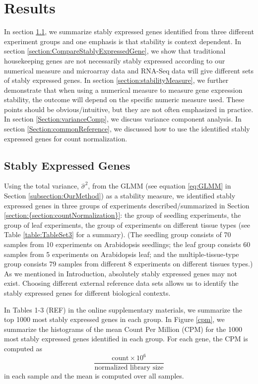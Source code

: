\documentclass[11pt, a4paper]{article}
\begin{document}
\section{Results} \label{section:Results}
In section \ref{section:stablyExpressedGene}, we summarize stably expressed genes identified from three
different experiment groups and one emphasis is that stability is
context dependent. In section \ref{section:CompareStablyExpressedGene}, we show that traditional housekeeping
genes are not necessarily stably expressed according to our numerical measure
and microarray data and RNA-Seq data will give different sets of stably
expressed genes.  In section \ref{section:stabilityMeasure}, we further demonstrate that when using a
numerical measure to measure gene expression stability, the outcome will
depend on the specific numeric measure used.  These points should be
obvious/intuitive, but they are not often emphasized in practice. 
In section \ref{Section:varianceComp}, we discuss variance component analysis. In section
\ref{Section:commonReference}, we discussed how to use the identified stably expressed genes for count
normalization.

\subsection{Stably Expressed Genes}\label{section:stablyExpressedGene}
Using the total variance, $\hat\sigma^2$, from the GLMM (see
equation \ref{eq:GLMM} in Section \ref{subsection:OurMethod}) as a
stability measure, we identified stably expressed genes in three groups of
experiments described/summarized in Section \ref{section:{section:countNormalization}}: the group of seedling
experiments, the group of leaf experiments, the group of experiments on
different tissue types (see Table \ref{table:TableSet3} for a summary).  (The
seedling group consists of 70 samples from 10 experiments on Arabidopsis
seedlings; the leaf group consists 60 samples from 5 experiments on
Arabidopsis leaf; and the multiple-tissue-type group consists 79 samples from
different 8 experiments on different tissues types.) As we mentioned in
Introduction, absolutely stably expressed genes may not exist.  Choosing
different external reference data sets allows us to identify the stably
expressed genes for different biological contexts.

In Tables 1-3 (REF) in the online supplementary materials, we summarize the
top 1000 most stably expressed genes in each group.  In Figure \ref{cpm}, we
summarize the histograms of the mean Count Per Million (CPM) for the 1000
most stably expressed genes identified in each group. For each gene, the CPM
is computed as \[ \dfrac{ \text{count} \times 10^6 }{ \text{normalized library
size}} \] in each sample and the mean is computed over all samples.
 
\end{document}
